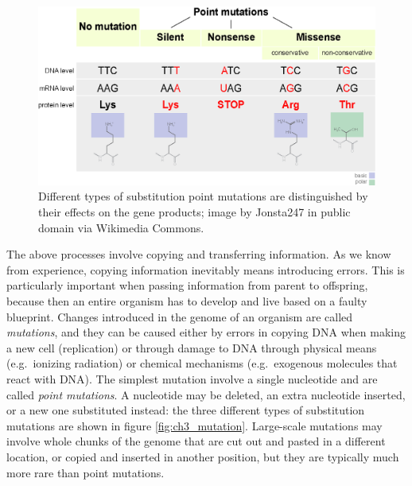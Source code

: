 \documentclass[
]{book}
\theoremstyle{definition}
\theoremstyle{definition}
\theoremstyle{definition}
\theoremstyle{remark}
\begin{document}
\begin{figure}
\centering
\includegraphics{ch3/Point_mutations-en.png}
\caption{Different types of substitution  point mutations are distinguished by their effects on the gene products; image by Jonsta247 in public domain via Wikimedia Commons.}
\end{figure}

The above processes involve copying and transferring information. As we know from experience, copying information inevitably means introducing errors. This is particularly important when passing information from parent to offspring, because then an entire organism has to develop and live based on a faulty blueprint. Changes introduced in the genome of an organism are called  \emph{mutations}, and they can be caused either by errors in copying DNA when making a new cell (replication) or through damage to DNA through physical means (e.g.~ionizing radiation) or chemical mechanisms (e.g.~exogenous molecules that react with DNA). The simplest mutation involve a single nucleotide and are called  \emph{point mutations}. A nucleotide may be deleted, an extra nucleotide inserted, or a new one substituted instead: the three different types of substitution mutations are shown in figure \ref{fig:ch3_mutation}. Large-scale mutations may involve whole chunks of the genome that are cut out and pasted in a different location, or copied and inserted in another position, but they are typically much more rare than point mutations.
\end{document}
